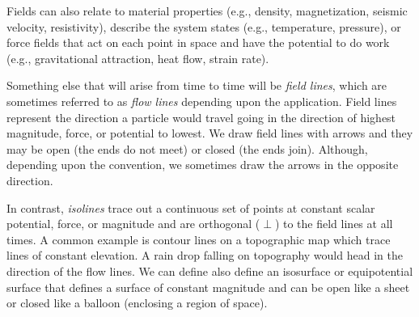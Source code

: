 Fields can also relate to material properties (e.g., density, magnetization, seismic velocity, resistivity), describe the system states (e.g., temperature, pressure), or force fields that act on each point in space and have the potential to do work (e.g., gravitational attraction, heat flow, strain rate).

Something else that will arise from time to time will be {\it field lines}, which are sometimes referred to as {\it flow lines} depending upon the application. Field lines represent the direction a particle would travel going in the direction of highest magnitude, force, or potential to lowest.  We draw field lines with arrows and they may be open (the ends do not meet) or closed (the ends join).  Although, depending upon the convention, we sometimes draw the arrows in the opposite direction.

In contrast, {\it isolines} trace out a continuous set of points at constant scalar potential, force, or magnitude and are orthogonal ($\perp$) to the field lines at all times.  A common example is contour lines on a topographic map which trace lines of constant elevation.  A rain drop falling on topography would head in the direction of the flow lines.  We can define also define an isosurface or equipotential surface that defines a surface of constant magnitude and can be open like a sheet or closed like a balloon (enclosing a region of space).


